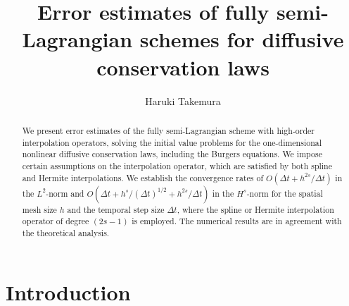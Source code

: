 \documentclass[10pt,a4paper,tbtags,leqno]{amsart}
\title[Error estimates of fully semi-Lagrangian schemes]{Error estimates of fully semi-Lagrangian schemes for diffusive conservation laws}
\author{Haruki Takemura}
\date{}
\theoremstyle{definition}
\numberwithin{equation}{section}
\begin{document}
 

\begin{abstract} 
  We present error estimates of the fully semi-Lagrangian scheme with high-order interpolation operators, solving the initial value problems for the one-dimensional nonlinear diffusive conservation laws, including the Burgers equations. We impose certain assumptions on the interpolation operator, which are satisfied by both spline and Hermite interpolations. We establish the convergence rates of $ O(\Delta t + h^{2 s} / \Delta t) $ in the $ L^2 $-norm and $ O(\Delta t + h^{s} / (\Delta t)^{1/2} + h^{2s} / \Delta t) $ in the $ H^s $-norm for the spatial mesh size $ h $ and the temporal step size $ \Delta t $, where the spline or Hermite interpolation operator of degree $ (2s - 1) $ is employed. The numerical results are in agreement with the theoretical analysis. 
\end{abstract} 

\maketitle 

\section{Introduction} 
\end{document}
